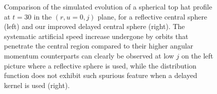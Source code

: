 \documentclass[useAMS,usenatbib]{mn2e}
\begin{document}
\begin{figure}
\begin{minipage}[c]{\linewidth}
\begin{centering}
\caption{Comparison of the simulated evolution of a spherical top hat profile at $t=30$ in the $\left(r,u=0,j\right)$ plane, for a reflective central sphere (left) and our improved delayed central sphere (right). The systematic artificial speed increase undergone by orbits that penetrate the central region compared to their higher angular momentum counterparts can clearly be observed at low $j$ on the left picture where a reflective sphere is used, while the distribution function does not exhibit such spurious feature when a delayed kernel is used (right).}
\end{centering}
\end{minipage}
\label{fig:delayed}
\end{figure}
\end{document}
